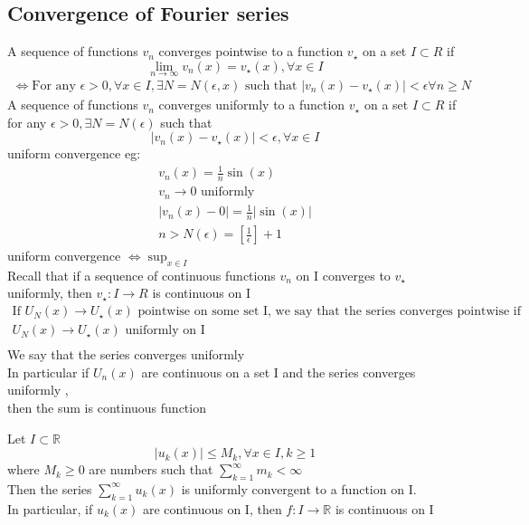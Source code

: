 \subsection{Convergence of Fourier series}
A sequence of functions $ v_n $ converges pointwise to a function $ v_\star $ on a set $ I\subset R $ if$$
    \lim_{n\rightarrow\infty}v_n(x)=v_\star(x),\forall x\in I
$$ 
\begin{align*}{}{}
\Leftrightarrow \text{For any } \epsilon>0,\forall x\in I,\exists N=N(\epsilon,x) \text{ such that } |v_n(x)-v_\star(x)|<\epsilon \forall n\geq N
\end{align*}
A sequence of functions $ v_n $ converges uniformly to a function $ v_\star $ on a set $ I\subset R $ if for any $ \epsilon>0,\exists N=N(\epsilon) $ such that$$
    |v_n(x)-v_\star(x)|<\epsilon,\forall x\in I
$$ 
uniform convergence eg:\begin{align*}{}{}
v_n(x)=\frac{1}{n}\sin(x)\\
v_n\rightarrow0 \text{ uniformly}\\
|v_n(x)-0|=\frac{1}{n}|\sin(x)|\\
n>N(\epsilon)=[\frac{1}{\epsilon}]+1
\end{align*}
uniform convergence $ \Leftrightarrow \sup_{x\in I}$
\\Recall that if a sequence of continuous functions $ v_n $ on I converges to $ v_\star $ uniformly, then $ v_\star:I\rightarrow R $ is continuous on I 
\begin{align*}{}{}
\text{If } U_N(x)\rightarrow U_\star(x) \text{ pointwise on some set I, we say that the series converges pointwise if }\\
U_N(x)\rightarrow U_\star(x) \text{ uniformly on I}\\
\end{align*}  
We say that the series converges uniformly\\
In particular if $ U_n(x) $ are continuous on a set I and the series converges uniformly ,\\
then the sum is continuous function
\begin{theorem}{}
Let $ I\subset\mathbb{R} $ $$
    |u_k(x)|\leq M_k,\forall x\in I,k\geq1
$$ 
where $ M_k\geq0 $ are numbers such that $ \sum_{k=1}^{\infty}m_k<\infty $ 
\\Then the series $ \sum_{k=1}^{\infty}u_k(x) $ is uniformly convergent to a function on I.
\\In particular, if $ u_k(x) $ are continuous on I, then $ f:I\rightarrow\mathbb{R} $  is continuous on I 
\end{theorem}
